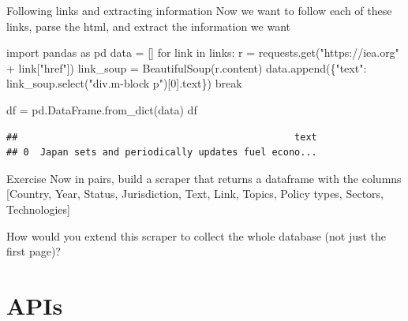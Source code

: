 \documentclass[
  10pt,
  ignorenonframetext,
  aspectratio=169]{beamer}
\newenvironment{Shaded}{\begin{snugshade}}{\end{snugshade}}
\newcommand{\ControlFlowTok}[1]{\textcolor[rgb]{0.94,0.87,0.69}{#1}}
\newcommand{\DecValTok}[1]{\textcolor[rgb]{0.86,0.86,0.80}{#1}}
\newcommand{\ImportTok}[1]{\textcolor[rgb]{0.80,0.80,0.80}{#1}}
\newcommand{\KeywordTok}[1]{\textcolor[rgb]{0.94,0.87,0.69}{#1}}
\newcommand{\NormalTok}[1]{\textcolor[rgb]{0.80,0.80,0.80}{#1}}
\newcommand{\OperatorTok}[1]{\textcolor[rgb]{0.94,0.94,0.82}{#1}}
\newcommand{\StringTok}[1]{\textcolor[rgb]{0.80,0.58,0.58}{#1}}
\begin{document}
\begin{frame}[fragile]{Following links and extracting information}
\protect\hypertarget{following-links-and-extracting-information-1}{}
Now we want to follow each of these links, parse the html, and extract
the information we want

\scriptsize

\begin{Shaded}
\begin{Highlighting}[]
\ImportTok{import}\NormalTok{ pandas }\ImportTok{as}\NormalTok{ pd}
\NormalTok{data }\OperatorTok{=}\NormalTok{ []}
\ControlFlowTok{for}\NormalTok{ link }\KeywordTok{in}\NormalTok{ links:}
\NormalTok{    r }\OperatorTok{=}\NormalTok{ requests.get(}\StringTok{"https://iea.org"} \OperatorTok{+}\NormalTok{ link[}\StringTok{"href"}\NormalTok{])}
\NormalTok{    link\_soup }\OperatorTok{=}\NormalTok{ BeautifulSoup(r.content)}
\NormalTok{    data.append(\{}\StringTok{"text"}\NormalTok{: link\_soup.select(}\StringTok{"div.m{-}block p"}\NormalTok{)[}\DecValTok{0}\NormalTok{].text\})}
    \ControlFlowTok{break}
    
\NormalTok{df }\OperatorTok{=}\NormalTok{ pd.DataFrame.from\_dict(data)}
\NormalTok{df}
\end{Highlighting}
\end{Shaded}

\begin{verbatim}
##                                                 text
## 0  Japan sets and periodically updates fuel econo...
\end{verbatim}
\end{frame}

\begin{frame}{Exercise}
\protect\hypertarget{exercise}{}
Now in pairs, build a scraper that returns a dataframe with the columns
{[}Country, Year, Status, Jurisdiction, Text, Link, Topics, Policy
types, Sectors, Technologies{]}

How would you extend this scraper to collect the whole database (not
just the first page)?
\end{frame}

\hypertarget{apis}{%
\section{APIs}\label{apis}}
\end{document}
